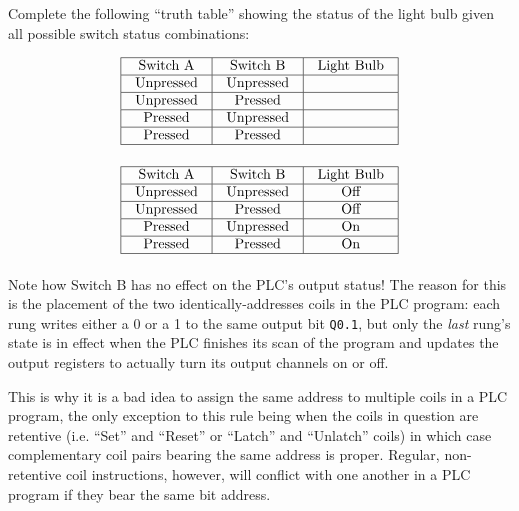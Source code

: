 Complete the following ``truth table'' showing the status of the light bulb given all possible switch status combinations:


$$\vbox{\offinterlineskip
\halign{\strut
\vrule \quad\hfil # \ \hfil & 
\vrule \quad\hfil # \ \hfil & 
\vrule \quad\hfil # \ \hfil \vrule \cr
\noalign{\hrule}
%
Switch A & Switch B & Light Bulb \cr
%
\noalign{\hrule}
%
Unpressed & Unpressed & \cr
%
\noalign{\hrule}
%
Unpressed & Pressed & \cr
%
\noalign{\hrule}
%
Pressed & Unpressed & \cr
%
\noalign{\hrule}
%
Pressed & Pressed & \cr
%
\noalign{\hrule}
} %
}$$ %








$$\vbox{\offinterlineskip
\halign{\strut
\vrule \quad\hfil # \ \hfil & 
\vrule \quad\hfil # \ \hfil & 
\vrule \quad\hfil # \ \hfil \vrule \cr
\noalign{\hrule}
%
Switch A & Switch B & Light Bulb \cr
%
\noalign{\hrule}
%
Unpressed & Unpressed & Off \cr
%
\noalign{\hrule}
%
Unpressed & Pressed & Off \cr
%
\noalign{\hrule}
%
Pressed & Unpressed & On \cr
%
\noalign{\hrule}
%
Pressed & Pressed & On \cr
%
\noalign{\hrule}
} %
}$$ %

\vskip 10pt

Note how Switch B has no effect on the PLC's output status!  The reason for this is the placement of the two identically-addresses coils in the PLC program: each rung writes either a 0 or a 1 to the same output bit {\tt Q0.1}, but only the {\it last} rung's state is in effect when the PLC finishes its scan of the program and updates the output registers to actually turn its output channels on or off.

This is why it is a bad idea to assign the same address to multiple coils in a PLC program, the only exception to this rule being when the coils in question are retentive (i.e. ``Set'' and ``Reset'' or ``Latch'' and ``Unlatch'' coils) in which case complementary coil pairs bearing the same address is proper.  Regular, non-retentive coil instructions, however, will conflict with one another in a PLC program if they bear the same bit address.











